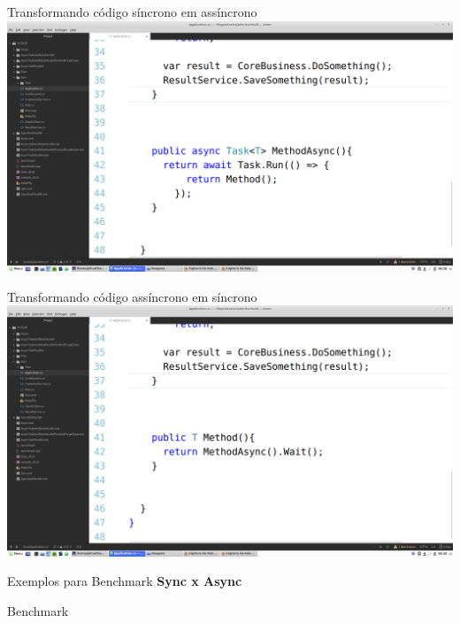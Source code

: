 \documentclass[10pt]{beamer}
\begin{document}
\begin{frame}{Transformando código síncrono em assíncrono}
	\includegraphics[width=\textwidth]{imgs/02-syncToAsync.png}
\end{frame}

\begin{frame}{Transformando código assíncrono em síncrono}
	\includegraphics[width=\textwidth]{imgs/03-asyncToSync.png}
\end{frame}

\begin{frame}{Exemplos para Benchmark}
	\textbf{Sync x Async}
\end{frame}


\begin{frame}{Benchmark}
	\begin{figure}
	\end{figure}
\end{frame}
\end{document}
